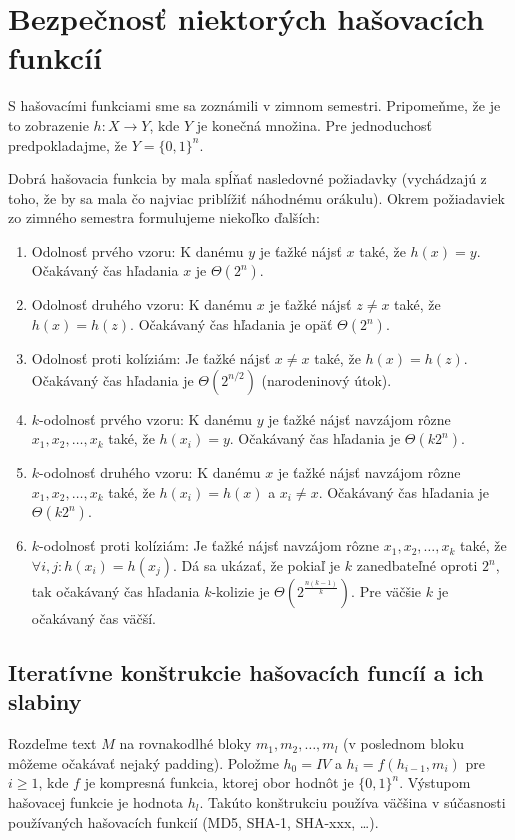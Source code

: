 \section{Bezpečnosť niektorých hašovacích funkcíí}

S hašovacími funkciami sme sa zoznámili v zimnom semestri.
Pripomeňme, že je to zobrazenie $h: X \to Y$, kde $Y$ je konečná množina.
Pre jednoduchosť predpokladajme, že $Y = \{0,1\}^n$. 

Dobrá hašovacia funkcia by mala spĺňať nasledovné požiadavky 
(vychádzajú z toho, že by sa mala čo najviac priblížiť náhodnému orákulu). 
Okrem požiadaviek zo zimného semestra formulujeme niekoľko ďalších:
\begin{enumerate}
\itemsep -1.2mm
\item Odolnosť prvého vzoru: K danému $y$ je ťažké nájsť $x$ také, 
že $h(x) = y$. Očakávaný čas hľadania $x$ je $\Theta(2^n)$.
\item Odolnosť druhého vzoru: K danému $x$ je ťažké nájsť 
$z \neq x$ také, že $h(x) = h(z)$. Očakávaný čas hľadania je opäť
$\Theta(2^n)$.
\item Odolnosť proti kolíziám: Je ťažké nájsť $x \neq x$ také, 
že $h(x) = h(z)$. Očakávaný čas hľadania je $\Theta(2^{n/2})$ (narodeninový útok).
\vskip 0.5cm
\item $k$-odolnosť prvého vzoru: K danému $y$ je ťažké nájsť navzájom rôzne 
$x_1, x_2, \dots, x_k$ také, že $h(x_i) = y$. Očakávaný čas hľadania
je $\Theta(k 2^n)$.
\item $k$-odolnosť druhého vzoru: K danému $x$ je ťažké nájsť navzájom rôzne 
$x_1, x_2, \dots, x_k$ také, že $h(x_i) = h(x)$ a $x_i \neq x$.
Očakávaný čas hľadania je $\Theta(k 2^n)$.
\item $k$-odolnosť proti kolíziám: Je ťažké nájsť navzájom rôzne 
$x_1, x_2, \dots, x_k$ také, že $\forall i, j\colon h(x_i) = h(x_j)$. 
Dá sa ukázať, že pokiaľ je $k$ zanedbateľné oproti $2^n$, tak očakávaný 
čas hľadania $k$-kolizie je $\Theta(2^{\frac{n(k-1)}{k}})$.
Pre väčšie $k$ je očakávaný čas väčší.
\end{enumerate}

\subsection {Iteratívne konštrukcie hašovacích funcíí a ich slabiny}

Rozdeľme text $M$ na rovnakodlhé bloky $m_1, m_2, \dots, m_l$
(v poslednom bloku môžeme očakávať nejaký padding).
Položme $h_0 = IV$ a $h_i = f(h_{i-1}, m_i)$ pre $i \geq 1$, kde $f$ 
je kompresná funkcia, ktorej obor hodnôt je $\{0,1\}^n$.
Výstupom hašovacej funkcie je hodnota $h_l$. Takúto konštrukciu 
používa väčšina v súčasnosti používaných hašovacích funkcií
(MD5, SHA-1, SHA-xxx, \dots).

